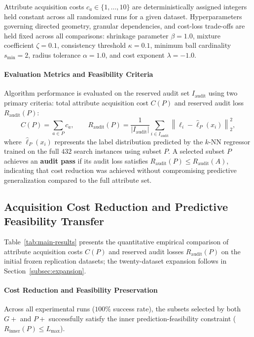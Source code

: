 Attribute acquisition costs $c_a \in \{1, \dots, 10\}$ are deterministically assigned integers held constant across all randomized runs for a given dataset. Hyperparameters governing directed geometry, granular dependencies, and cost-loss trade-offs are held fixed across all comparisons: shrinkage parameter $\beta = 1.0$, mixture coefficient $\zeta = 0.1$, consistency threshold $\kappa = 0.1$, minimum ball cardinality $s_{\min} = 2$, radius tolerance $\alpha = 1.0$, and cost exponent $\lambda = -1.0$.

\paragraph{Evaluation Metrics and Feasibility Criteria}
Algorithm performance is evaluated on the reserved audit set $I_{\mathrm{audit}}$ using two primary criteria: total attribute acquisition cost $C(P)$ and reserved audit loss $R_{\mathrm{audit}}(P)$:
\begin{equation}
	C(P) = \sum_{a \in P} c_a, \qquad R_{\mathrm{audit}}(P) = \frac{1}{|I_{\mathrm{audit}}|} \sum_{i \in I_{\mathrm{audit}}} \left\| \boldsymbol{\ell}_i - \widehat{\boldsymbol{\ell}}_P(x_i) \right\|_2^2,
	\label{eq:audit-metrics}
\end{equation}
where $\widehat{\boldsymbol{\ell}}_P(x_i)$ represents the label distribution predicted by the $k$-NN regressor trained on the full $432$ search instances using subset $P$. A selected subset $P$ achieves an \textbf{audit pass} if its audit loss satisfies $R_{\mathrm{audit}}(P) \le R_{\mathrm{audit}}(A)$, indicating that cost reduction was achieved without compromising predictive generalization compared to the full attribute set.

\subsection{Acquisition Cost Reduction and Predictive Feasibility Transfer}
\label{subsec:cost-reduction-results}



Table~\ref{tab:main-results} presents the quantitative empirical comparison of attribute acquisition costs $C(P)$ and reserved audit losses $R_{\mathrm{audit}}(P)$ on the initial frozen replication datasets; the twenty-dataset expansion follows in Section~\ref{subsec:expansion}.

\paragraph{Cost Reduction and Feasibility Preservation}
Across all experimental runs ($100\%$ success rate), the subsets selected by both $G+$ and $P+$ successfully satisfy the inner prediction-feasibility constraint ($R_{\mathrm{inner}}(P) \le L_{\max}$). 

